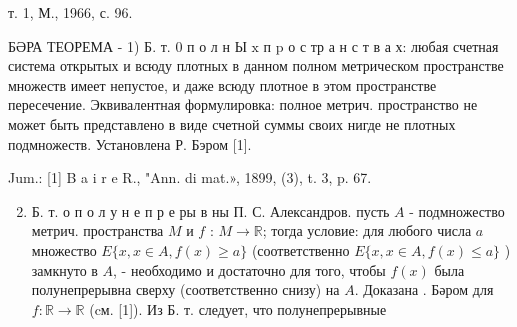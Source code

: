 \documentclass[10pt]{article}
\begin{document}
т. 1, М., 1966, с. 96.



БӘРА ТЕОРЕМА - 1) Б. т. 0 п о л н Ы $\mathrm{x}$ п $\mathrm{p}$ о с тр а н с т в а х: любая счетная система открытых и всюду плотных в данном полном метрическом пространстве множеств имеет непустое, и даже всюду плотное в этом пространстве пересечение. Эквивалентная формулировка: полное метрич. пространство не может быть представлено в виде счетной суммы своих нигде не плотных подмножеств. Установлена Р. Бэром [1].



Jum.: [1] B a i r e R., "Ann. di mat.», 1899, (3), t. 3, p. 67.



\begin{enumerate}

  \setcounter{enumi}{1}

  \item Б. т. о п о л у н е п р е ры в ны П. С. Александров. пусть $A$ - подмножество метрич. пространства $M$ и $f$ : $M \rightarrow \mathbb{R}$; тогда условие: для любого числа $a$ множество $E\{x, x \in A, f(x) \geqslant a\}$ (соответственно $E\{x, x \in A, f(x) \leqslant a\}$ ) замкнуто в $A$, - необходимо и достаточно для того, чтобы $f(x)$ была полунепрерывна сверху (соответственно снизу) на $A$. Доказана . Бәром для $f: \mathbb{R} \rightarrow \mathbb{R}$ (cм. [1]). Из Б. т. следует, что полунепрерывные

\end{enumerate}
\end{document}
